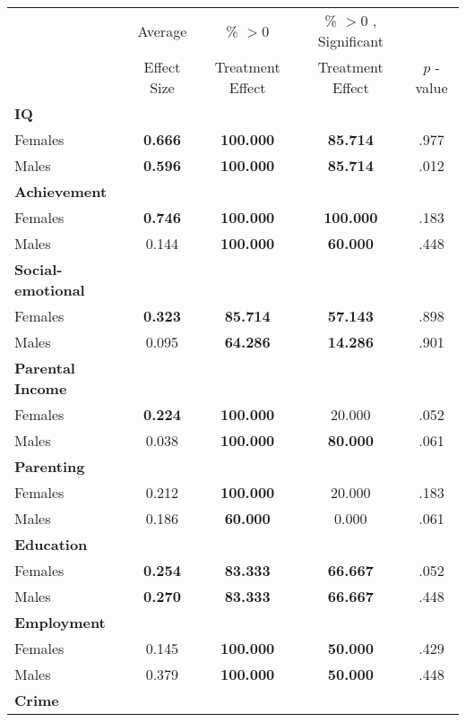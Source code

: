 \begin{tabular}{l c c c c}
\toprule
 & Average & \% $ >0 $ & \% $ >0 $ , Significant & \citet{Rosenbaum_2005_Distribution_JRSS} \\
 & Effect Size & Treatment Effect & Treatment Effect & $ p $ -value \\
\midrule
\textbf{IQ} & & & & \\
\quad Females &  \textbf{    0.666} & \textbf{  100.000} & \textbf{   85.714} & .977 \\
\quad Males &  \textbf{    0.596} & \textbf{  100.000} & \textbf{   85.714} & .012 \\
\midrule
\textbf{Achievement} & & & & \\
\quad Females &  \textbf{    0.746} & \textbf{  100.000} & \textbf{  100.000} & .183 \\
\quad Males &      0.144 & \textbf{  100.000} & \textbf{   60.000} & .448 \\
\midrule
\textbf{Social-emotional} & & & & \\
\quad Females &  \textbf{    0.323} & \textbf{   85.714} & \textbf{   57.143} & .898 \\
\quad Males &      0.095 & \textbf{   64.286} & \textbf{   14.286} & .901 \\
\midrule
\textbf{Parental Income} & & & & \\
\quad Females &  \textbf{    0.224} & \textbf{  100.000} &    20.000 & .052 \\
\quad Males &      0.038 & \textbf{  100.000} & \textbf{   80.000} & .061 \\
\midrule
\textbf{Parenting} & & & & \\
\quad Females &      0.212 & \textbf{  100.000} &    20.000 & .183 \\
\quad Males &      0.186 & \textbf{   60.000} &     0.000 & .061 \\
\midrule
\textbf{Education} & & & & \\
\quad Females &  \textbf{    0.254} & \textbf{   83.333} & \textbf{   66.667} & .052 \\
\quad Males &  \textbf{    0.270} & \textbf{   83.333} & \textbf{   66.667} & .448 \\
\midrule
\textbf{Employment} & & & & \\
\quad Females &      0.145 & \textbf{  100.000} & \textbf{   50.000} & .429 \\
\quad Males &      0.379 & \textbf{  100.000} & \textbf{   50.000} & .448 \\
\midrule
\textbf{Crime} & & & & \\

\end{tabular}
